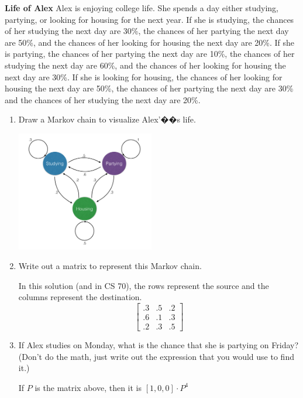\question \textbf{Life of Alex} \newline
Alex is enjoying college life. She spends a day either studying, 
partying, or looking for housing for the next year. If she is studying, 
the chances of her studying the next day are 30\%, the chances of her 
partying the next day are 50\%, and the chances of her looking for 
housing the next day are 20\%. If she is partying, the chances of her 
partying the next day are 10\%, the chances of her studying the next 
day are 60\%, and the chances of her looking for housing the next day 
are 30\%. If she is looking for housing, the chances of her looking 
for housing the next day are 50\%, the chances of her partying the 
next day are 30\% and the chances of her studying the next day are 20\%.

\begin{enumerate}[label=(\alph*)]
\item Draw a Markov chain to visualize Alex'��s life.
\begin{solution}[3cm]
\includegraphics[width=6cm]{life_of_alex.jpg}
\end{solution}

\item Write out a matrix to represent this Markov chain.
\begin{solution}[2cm]
In this solution (and in CS 70), the rows represent the source and the columns represent the destination. 
\[\begin{bmatrix}
.3 & .5 & .2 \\
.6 & .1 & .3\\
.2 & .3 & .5
\end{bmatrix}
\]
\end{solution}

\item If Alex studies on Monday, what is the chance that she is 
partying on Friday? (Don't do the math, just write out the expression 
that you would use to find it.)
\begin{solution}[1cm]
If $P$ is the matrix above, then it is $[1, 0, 0] \cdot P^4$
\end{solution}


\end{enumerate}
